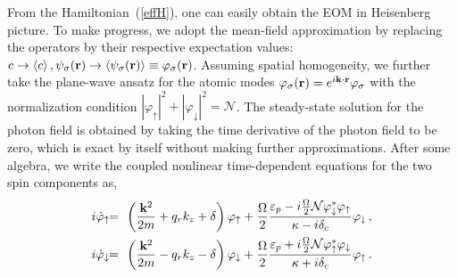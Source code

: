 \documentclass[atoms,article,submit,moreauthors,pdftex,12pt,a4paper]{mdpi}
\def\ba{\begin{eqnarray}}
\def\ea{\end{eqnarray}}
\begin{document}
From the Hamiltonian~(\ref{effH}), one can easily obtain the EOM in Heisenberg picture. To make progress, we adopt the mean-field approximation by replacing the operators by their respective expectation values: $c \rightarrow \langle c \rangle \,, \psi_\sigma ({\bf r}) \rightarrow \langle \psi_\sigma ({\bf r}) \rangle \equiv \varphi_\sigma ({\bf r})$. 
Assuming spatial homogeneity, we further take the plane-wave ansatz for the atomic modes $\varphi_\sigma({\bf r})=e^{i{\bf k}\cdot{\bf r}}\varphi_\sigma$ with the normalization condition $|\varphi_\uparrow|^2+|\varphi_\downarrow|^2=\mathcal{N}$. The steady-state solution for the photon field is obtained by taking the time derivative of the photon field to be zero, which is exact by itself without making further approximations. After some algebra, we write the coupled nonlinear time-dependent equations for the two spin components as, 
\ba
i\dot{\varphi}_{\uparrow}&\!\! =\!\! & \left(\frac{{\bf k}^{2}}{2m}+q_{r}k_{z}+\delta\right) \varphi_{\uparrow}+\frac{\Omega}{2}\frac{\varepsilon_{p}-i\frac{\Omega}{2} \mathcal{N}\varphi_\downarrow^\ast\varphi_\uparrow}{\kappa-i\delta_{c}}\varphi_{\downarrow} \,,\label{EOMphi1}\\
i\dot{\varphi}_{\downarrow} & \!\!= \!\!& \left(\frac{{\bf k}^{2}}{2m}-q_{r}k_{z}-\delta\right)\varphi_{\downarrow}+\frac{\Omega}{2}\frac{\varepsilon_{p}+i\frac{\Omega}{2} \mathcal{N}\varphi_\uparrow^\ast\varphi_\downarrow}{\kappa+i\delta_{c}}\varphi_{\uparrow}\,.\label{EOMphi2}
\ea
\end{document}
